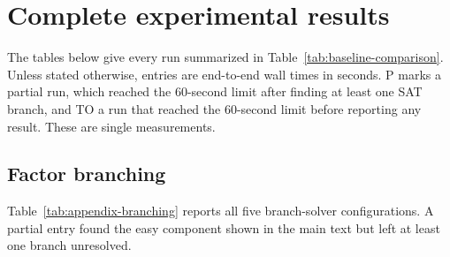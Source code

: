 \appendix
\section{Complete experimental results}
\label{sec:appendix}

The tables below give every run summarized in
Table~\ref{tab:baseline-comparison}.  Unless stated otherwise, entries are
end-to-end wall times in seconds.  \textnormal{P} marks a partial run, which
reached the 60-second limit after finding at least one SAT branch, and
\textnormal{TO} a run that reached the 60-second limit before reporting any
result.  These are single measurements.

\subsection{Factor branching}

Table~\ref{tab:appendix-branching} reports all five branch-solver
configurations.  A partial entry found the easy component shown in the main
text but left at least one branch unresolved.

